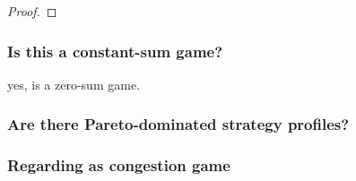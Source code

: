 \documentclass{article}
\begin{document}
\begin{proof}
 
\end{proof}



\subsubsection{Is this a constant-sum game?}
yes, is a zero-sum game.

\subsubsection{Are there Pareto-dominated strategy profiles?}

\subsubsection{Regarding as congestion game}
\end{document}
